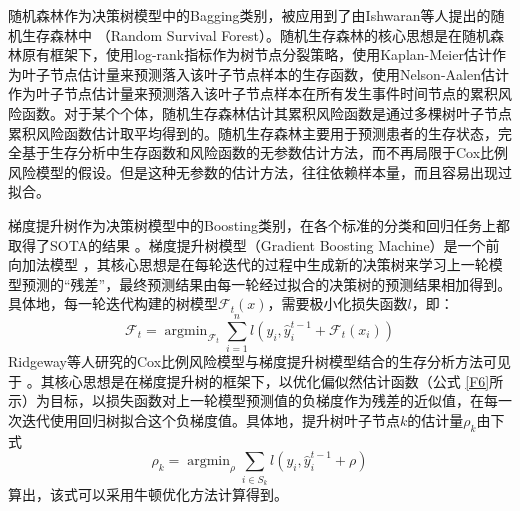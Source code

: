 随机森林作为决策树模型中的Bagging类别，被应用到了由Ishwaran等人提出的随机生存森林中 （Random Survival Forest）。随机生存森林的核心思想是在随机森林原有框架下，使用log-rank指标作为树节点分裂策略，使用Kaplan-Meier估计作为叶子节点估计量来预测落入该叶子节点样本的生存函数，使用Nelson-Aalen估计作为叶子节点估计量来预测落入该叶子节点样本在所有发生事件时间节点的累积风险函数。对于某个个体，随机生存森林估计其累积风险函数是通过多棵树叶子节点累积风险函数估计取平均得到的。随机生存森林主要用于预测患者的生存状态，完全基于生存分析中生存函数和风险函数的无参数估计方法，而不再局限于Cox比例风险模型的假设。但是这种无参数的估计方法，往往依赖样本量，而且容易出现过拟合。

梯度提升树作为决策树模型中的Boosting类别，在各个标准的分类和回归任务上都取得了SOTA的结果 。梯度提升树模型（Gradient Boosting Machine）是一个前向加法模型 ，其核心思想是在每轮迭代的过程中生成新的决策树来学习上一轮模型预测的“残差”，最终预测结果由每一轮经过拟合的决策树的预测结果相加得到。具体地，每一轮迭代构建的树模型$\mathcal{F}_t (x)$，需要极小化损失函数$l$，即：
\begin{equation}
\mathcal{F}_t = \mathop{\arg\min}_{\mathcal{F}_t} \sum_{i=1}^n l(y_i, \hat{y}_i^{t-1} + \mathcal{F}_t(x_i)) \label{F9}
\end{equation}
Ridgeway等人研究的Cox比例风险模型与梯度提升树模型结合的生存分析方法可见于 。其核心思想是在梯度提升树的框架下，以优化偏似然估计函数（公式 \eqref{F6}所示）为目标，以损失函数对上一轮模型预测值的负梯度作为残差的近似值，在每一次迭代使用回归树拟合这个负梯度值。具体地，提升树叶子节点$k$的估计量$\rho_k$由下式
\begin{equation}
\rho_k = \mathop{\arg\min}_{\rho} \sum_{i\in S_k} l(y_i, \hat{y}_i^{t-1} + \rho) \label{F10}
\end{equation}算出，该式可以采用牛顿优化方法计算得到。

